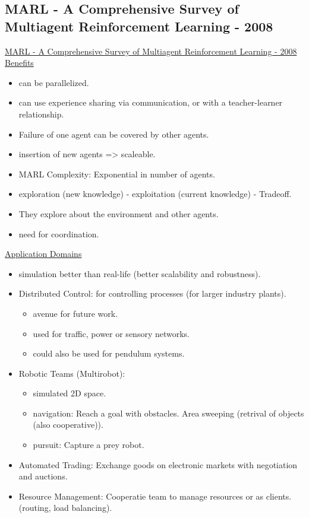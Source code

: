 \subsection{MARL - A Comprehensive Survey of Multiagent Reinforcement Learning - 2008}
\href{https://ieeexplore.ieee.org/abstract/document/4445757}{MARL - A Comprehensive Survey of Multiagent Reinforcement Learning - 2008}
\\
\underline{Benefits}
\begin{itemize}[noitemsep,nolistsep]
	\item can be parallelized.
	\item can use experience sharing via communication, or with a teacher-learner relationship.
	\item Failure of one agent can be covered by other agents.
	\item insertion of new agents => scaleable.
	\item MARL Complexity: Exponential in number of agents.
	\item exploration (new knowledge) - exploitation (current knowledge) - Tradeoff.
	\item They explore about the environment and other agents.
	\item need for coordination.
\end{itemize}
\underline{Application Domains}
\begin{itemize}[noitemsep,nolistsep]
	\item simulation better than real-life (better scalability and robustness).
	\item Distributed Control: for controlling processes (for larger industry plants).
	\begin{itemize}[noitemsep,nolistsep]
		\item avenue for future work.
		\item used for traffic, power or sensory networks.
		\item could also be used for pendulum systems.
	\end{itemize}
	\item Robotic Teams (Multirobot):
	\begin{itemize}[noitemsep,nolistsep]
		\item simulated 2D space. 
		\item navigation: Reach a goal with obstacles. Area sweeping (retrival of objects (also cooperative)).
		\item pursuit: Capture a prey robot.
	\end{itemize}
	\item Automated Trading: Exchange goods on electronic markets with negotiation and auctions.
	\item Resource Management: Cooperatie team to manage resources or as clients. (routing, load balancing).
\end{itemize}
